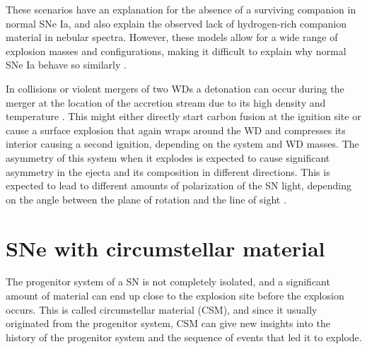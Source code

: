 \documentclass[a4paper,oneside,12pt, class=Latex/Classes/PhDthesisPSnPDF, crop=false]{standalone}
\begin{document}
These scenarios have an explanation for the absence of a surviving companion in normal SNe Ia, and also explain the observed lack of hydrogen-rich companion material in nebular spectra. However, these models allow for a wide range of explosion masses and configurations, making it difficult to explain why normal SNe Ia behave so similarly \citep{SNe_Ia_and_progenitors_review}.

In collisions or violent mergers of two WDs a detonation can occur during the merger at the location of the accretion stream due to its high density and temperature \citep{Rosswog_merger, Pakmor_merger, Pakmor_merger2}. This might either directly start carbon fusion at the ignition site or cause a surface explosion that again wraps around the WD and compresses its interior causing a second ignition, depending on the system and WD masses. The asymmetry of this system when it explodes is expected to cause significant asymmetry in the ejecta and its composition in different directions. This is expected to lead to different amounts of polarization of the SN light, depending on the angle between the plane of rotation and the line of sight \citep{Wang_merger_pol, Bulla_merger_pol}.


\section{SNe with circumstellar material}
\label{SN_with_CSM}
The progenitor system of a SN is not completely isolated, and a significant amount of material can end up close to the explosion site before the explosion occurs. This is called circumstellar material (CSM), and since it usually originated from the progenitor system, CSM can give new insights into the history of the progenitor system and the sequence of events that led it to explode.
\end{document}
